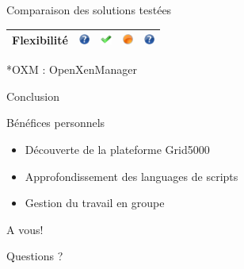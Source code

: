 \documentclass{beamer}
\begin{document}
\begin{frame}{Comparaison des solutions testées}
\begin{center}
\begin{tabular}{|c|c|c|c|c|}
\hline
Flexibilité & \includegraphics[width=10pt]{images_presentation/question.png}& \includegraphics[width=10pt]{images_presentation/ok.png}& \includegraphics[width=10pt]{images_presentation/moyen.png}& \includegraphics[width=10pt]{images_presentation/question.png}\tabularnewline
\hline
\end{tabular}
\end{center}
\newline
*OXM : OpenXenManager
\end{frame}


\begin{frame}{Conclusion}
  \begin{block}{Bénéfices personnels}
    \begin{itemize}
      \item Découverte de la plateforme Grid5000
      \item Approfondissement des languages de scripts
      \item Gestion du travail en groupe
    \end{itemize}
  \end{block}
\end{frame}

\begin{frame}{A vous!}
  \begin{center}
   \huge{Questions ?}
  \end{center}
\end{frame}
\end{document}
